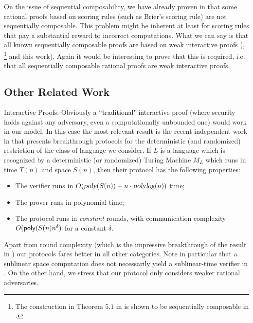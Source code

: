 On the issue of sequential composability, we have already proven in \cite{cg15} that some rational proofs based on scoring rules (such as Brier's scoring rule) are not  sequentially composable. 
This problem might be inherent at least for scoring rules that pay a substantial reward to incorrect computations. What we can say is that all known sequentially composable proofs are based on weak interactive proofs (\cite{cg15}, \cite{am1}\footnote{The construction in Theorem $5.1$ in \cite{am1} is shown to be sequentially composable in \cite{cg15}.} and this work). Again it would be interesting to prove that this is required, i.e. that all sequentially composable rational proofs are weak interactive proofs. 


\subsection{Other Related  Work}
\label{sec:prior}

{\sc Interactive Proofs.}
Obviously a ``traditional" interactive proof (where security holds against any adversary, even a computationally unbounded one) would work in our model. In this case the most relevant result is 
the recent independent work in \cite{rrr16} that presents breakthrough protocols for the deterministic (and randomized) restriction of the class of language we consider. If $L$ is a language which is recognized by a deterministic (or randomized) Turing Machine $M_L$ which runs in time $T(n)$ and space $S(n)$, then their protocol has the following properties: 
\begin{itemize}
	\item The verifier runs in 
	$O({\textsl{poly}}(S(n)) + n \cdot{\ensuremath{\textsl{polylog}}}(n))$ time;
	\item The prover runs in polynomial time;
	\item The protocol runs in {\em constant} rounds, with communication complexity $O({\sf poly}(S(n)n^{\delta})$ for a constant $\delta$.
\end{itemize}
Apart from round complexity (which is the impressive breakthrough of the result in \cite{rrr16}) our protocols fares better in all other categories. Note in particular that a sublinear space computation does not necessarily yield a sublinear-time verifier in 
\cite{rrr16}. On the other hand, we stress that our protocol only considers weaker rational adversaries. 

